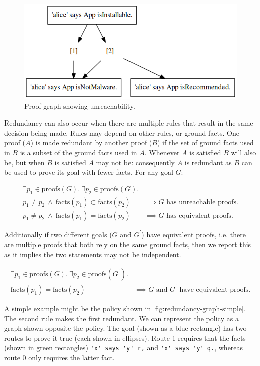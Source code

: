 \documentclass[thesis.tex]{subfiles}
\begin{document}
\begin{figure}
  \centering
  \includegraphics[width=0.5\linewidth]{./figures/unreachability.png}
  \caption{Proof graph showing unreachability.}
  \label{fig:unreachability}
\end{figure}

Redundancy can also occur when there are multiple rules that result in the
same decision being made.  Rules may depend on other rules, or ground
facts.  One proof ($A$) is made redundant by another proof ($B$) if
the set of ground facts used in $B$ is a subset of the ground facts
used in $A$. Whenever $A$ is satisfied $B$ will also be, but when $B$
is satisfied $A$ may not be: consequently $A$ is redundant as $B$ can
be used to prove its goal with fewer facts.  For any goal
$G$:

\begin{align*}
  \exists p_1 \in \text{proofs}(G).~\exists p_2 \in \text{proofs}(G).        & \\
  p_1 \not= p_2~\wedge~\text{facts}(p_1) \subset \text{facts}(p_2)           & \implies G\text{ has unreachable proofs.} \\
  p_1 \not= p_2~\wedge~\text{facts}(p_1) = \text{facts}(p_2)                 & \implies G\text{ has equivalent proofs.}
\end{align*}

Additionally if two different goals ($G$ and $G^\prime$) have
equivalent proofs, i.e. there are multiple proofs that both rely on the same ground facts, then we report this as it implies the two
statements may not be independent.

\begin{align*}
  \exists p_1 \in \text{proofs}(G).~\exists p_2 \in \text{proofs}(G^\prime). & \\
  \text{facts}(p_1) = \text{facts}(p_2)                                      & \implies \text{$G$ and $G^\prime$ have equivalent proofs.}
\end{align*}

A simple example might be the policy shown in \autoref{fig:redundancy-graph-simple}.
The second rule makes the first redundant.  We can represent the policy
as a graph shown opposite the policy.  The goal (shown as a blue rectangle) has two routes
to prove it true (each shown in ellipses).  Route 1 requires that the facts
(shown in green rectangles) \lstinline!'x' says 'y' r,! and
\lstinline!'x' says 'y' q.!, whereas route 0 only requires the
latter fact.
\end{document}
